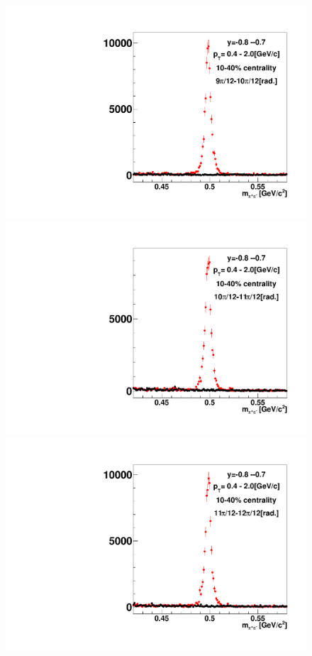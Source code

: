 \begin{figure}[h]
\includegraphics[width=0.14\linewidth]{chapterX/fig/ks_v1_sig/kf_ptslice0_cent1_ks_flow_phi10_rap12_check.pdf}
\includegraphics[width=0.14\linewidth]{chapterX/fig/ks_v1_sig/kf_ptslice0_cent1_ks_flow_phi11_rap12_check.pdf}
\includegraphics[width=0.14\linewidth]{chapterX/fig/ks_v1_sig/kf_ptslice0_cent1_ks_flow_phi12_rap12_check.pdf}


\end{figure}
